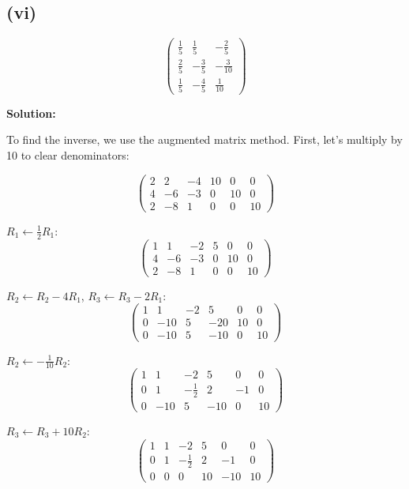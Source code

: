 \subsection*{(vi)}
\[
	\begin{pmatrix}
		\frac{1}{5} & \frac{1}{5}  & -\frac{2}{5}  \\
		\frac{2}{5} & -\frac{3}{5} & -\frac{3}{10} \\
		\frac{1}{5} & -\frac{4}{5} & \frac{1}{10}
	\end{pmatrix}
\]

\textbf{Solution:}

To find the inverse, we use the augmented matrix method. First, let's multiply by 10 to clear denominators:

\[
	\left(\begin{array}{ccc|ccc}
			2 & 2  & -4 & 10 & 0  & 0  \\
			4 & -6 & -3 & 0  & 10 & 0  \\
			2 & -8 & 1  & 0  & 0  & 10
		\end{array}\right)
\]

$R_1 \leftarrow \frac{1}{2}R_1$:
\[
	\left(\begin{array}{ccc|ccc}
			1 & 1  & -2 & 5 & 0  & 0  \\
			4 & -6 & -3 & 0 & 10 & 0  \\
			2 & -8 & 1  & 0 & 0  & 10
		\end{array}\right)
\]

$R_2 \leftarrow R_2 - 4R_1$, $R_3 \leftarrow R_3 - 2R_1$:
\[
	\left(\begin{array}{ccc|ccc}
			1 & 1   & -2 & 5   & 0  & 0  \\
			0 & -10 & 5  & -20 & 10 & 0  \\
			0 & -10 & 5  & -10 & 0  & 10
		\end{array}\right)
\]

$R_2 \leftarrow -\frac{1}{10}R_2$:
\[
	\left(\begin{array}{ccc|ccc}
			1 & 1   & -2           & 5   & 0  & 0  \\
			0 & 1   & -\frac{1}{2} & 2   & -1 & 0  \\
			0 & -10 & 5            & -10 & 0  & 10
		\end{array}\right)
\]

$R_3 \leftarrow R_3 + 10R_2$:
\[
	\left(\begin{array}{ccc|ccc}
			1 & 1 & -2           & 5  & 0   & 0  \\
			0 & 1 & -\frac{1}{2} & 2  & -1  & 0  \\
			0 & 0 & 0            & 10 & -10 & 10
		\end{array}\right)
\]

